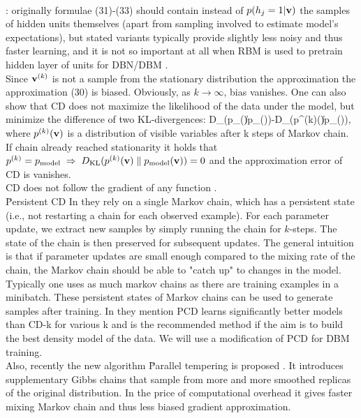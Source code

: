 \\[0.5em]
: originally formulae (31)-(33) should contain instead of $p(h_j=1|\mathbf{v})$ the samples of hidden units themselves (apart from sampling involved to estimate model's expectations), but stated variants typically provide slightly less noisy and thus faster learning, and it is not so important at all when RBM is used to pretrain hidden layer of units for DBN/DBM \cite{hinton2010practical}.
\\[1em]
Since $\mathbf{v}^{(k)}$ is not a sample from the stationary distribution the approximation the approximation (30) is biased. Obviously, as $k \rightarrow \infty$, bias vanishes. One can also show that CD does not maximize the likelihood of the data under the model, but minimize the difference of two KL-divergences:
\bg
D_{}(p_{}()\;\|\;p_{}())-D_{}(p^{(k)}()\;\|\;p_{}()),
\eg
where $p^{(k)}(\mathbf{v})$ is a distribution of visible variables after k steps of Markov chain. If chain already reached stationarity it holds that $p^{(k)}=p_{\text{model}} \;\Rightarrow\; D_{\text{KL}}(p^{(k)}(\mathbf{v})\;\|\;p_{\text{model}}(\mathbf{v}))=0$ and the approximation error of CD is vanishes.
\\[1em]
CD does not follow the gradient of any function \cite{hinton2010practical}.
\\[1em]
\u{Persistent CD}
In \cite{tieleman2008training} they rely on a single Markov chain, which has a persistent state (i.e., not restarting a chain for each observed example). For each parameter update, we extract new samples by simply running the chain for $k$-steps. The state of the chain is then preserved for subsequent updates. The general intuition is that if parameter updates are small enough compared to the mixing rate of the chain, the Markov chain should be able to "catch up" to changes in the model.
\\[1em]
Typically one uses as much markov chains as there are training examples in a minibatch. These persistent states of Markov chains can be used to generate samples after training. In \cite{hinton2010practical} they mention PCD learns significantly better models than CD-k for various k and is the recommended method if the aim is to build the best density model of the data. We will use a modification of PCD for DBM training.
\\[1em]
Also, recently the new algorithm \u{Parallel tempering} is proposed \cite{fischer2012introduction}. It introduces supplementary Gibbs chains that sample from more and more smoothed replicas of the original distribution. In the price of computational overhead it gives faster mixing Markov chain and thus less biased gradient approximation.
